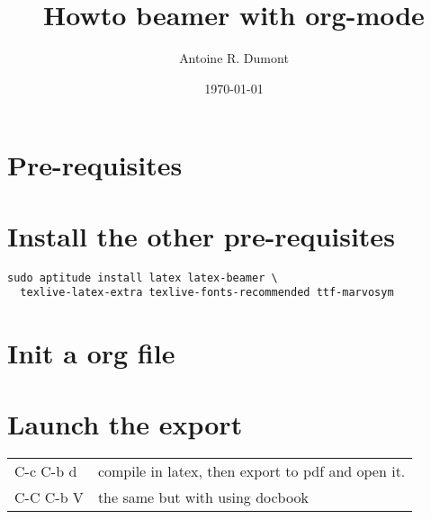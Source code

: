 \documentclass[11pt]{article}
\title{Howto beamer with org-mode}
\author{Antoine R. Dumont}
\date{\today}
\begin{document}
\maketitle

\setcounter{tocdepth}{3}
\tableofcontents
\vspace*{1cm}

\section{Pre-requisites}
\label{sec-1}
\section{Install the other pre-requisites}
\label{sec-2}


\begin{verbatim}
sudo aptitude install latex latex-beamer \
  texlive-latex-extra texlive-fonts-recommended ttf-marvosym
\end{verbatim}
\section{Init a org file}
\label{sec-3}
\section{Launch the export}
\label{sec-4}


\begin{center}
\begin{tabular}{ll}
\hline
 C-c C-b d  &  compile in latex, then export to pdf and open it.  \\
 C-C C-b V  &  the same but with using docbook                    \\
\hline
\end{tabular}
\end{center}
\end{document}
